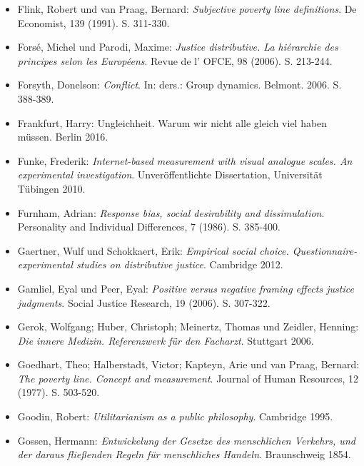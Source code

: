 \documentclass[a4paper]{thesis}
\begin{document}
\begin{itemize}[leftmargin=1.5em,label={},itemindent=-1.5em, itemsep=-1ex]
\item Flink, Robert und van Praag, Bernard: \textit{Subjective poverty line definitions}. De Economist, 139 (1991). S. 311-330.

\item Forsé, Michel und Parodi, Maxime: \textit{Justice distributive. La hiérarchie des principes selon les Européens}. Revue de l' OFCE, 98 (2006). S. 213-244.

\item Forsyth, Donelson: \textit{Conflict}. In: ders.: Group dynamics. Belmont. 2006. S. 388-389.

\item Frankfurt, Harry: Ungleichheit. Warum wir nicht alle gleich viel haben müssen. Berlin 2016.

\item Funke, Frederik: \textit{Internet-based measurement with visual analogue scales. An experimental investigation}. Unveröffentlichte Dissertation, Universität Tübingen 2010.

\item Furnham, Adrian: \textit{Response bias, social desirability and dissimulation}. Personality and Individual Differences, 7 (1986). S. 385-400.

\item Gaertner, Wulf und Schokkaert, Erik: \textit{Empirical social choice. Questionnaire-experimental studies on distributive justice}. Cambridge 2012.

\item Gamliel, Eyal und Peer, Eyal: \textit{Positive versus negative framing effects justice judgments}. Social Justice Research, 19 (2006). S. 307-322.

\item Gerok, Wolfgang; Huber, Christoph; Meinertz, Thomas und Zeidler, Henning: \textit{Die innere Medizin. Referenzwerk für den Facharzt}. Stuttgart 2006.

\item Goedhart, Theo; Halberstadt, Victor; Kapteyn, Arie und van Praag, Bernard: \textit{The poverty line. Concept and measurement}. Journal of Human Resources, 12 (1977). S. 503-520.

\item Goodin, Robert: \textit{Utilitarianism as a public philosophy}. Cambridge 1995.

\item Gossen, Hermann: \textit{Entwickelung der Gesetze des menschlichen Verkehrs, und der daraus fließenden Regeln für menschliches Handeln}. Braunschweig 1854.


\end{itemize}
\end{document}
